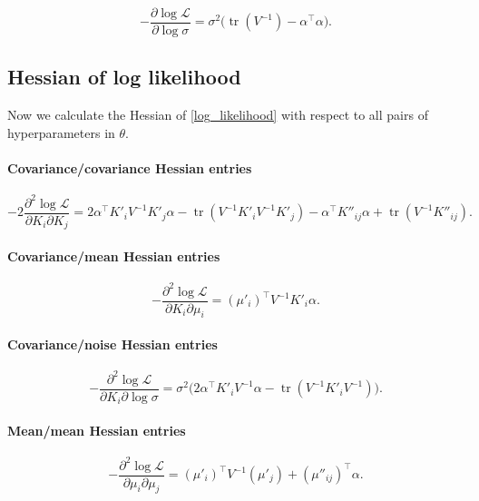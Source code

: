 \documentclass{article}
\newcommand{\cm}[1]{\mathcal{#1}}
\newcommand{\LL}{\cm{L}}
\newcommand{\trans}{^{\top}}
\newcommand{\inv}{^{-1}}
\DeclareMathOperator{\tr}{tr}
\begin{document}
\begin{equation*}
  -\frac{\partial \log \LL}{\partial \log \sigma}
  =
  \sigma^2 \bigl(\tr(V^{-1}) - \alpha\trans \alpha\bigr).
\end{equation*}

\subsection{Hessian of log likelihood}

Now we calculate the Hessian of \eqref{log_likelihood} with respect to
all pairs of hyperparameters in $\theta$.

\paragraph{Covariance/covariance Hessian entries}

\begin{equation*}
  -2 \frac{\partial^2 \log \LL}{\partial K_i \partial K_j}
  =
  2\alpha\trans K'_i  V\inv K'_j \alpha
  - \tr(V\inv K'_i V\inv K'_j)
  - \alpha\trans K''_{ij} \alpha
  + \tr(V\inv K''_{ij}).
\end{equation*}

\paragraph{Covariance/mean Hessian entries}

\begin{equation*}
  -\frac{\partial^2 \log \LL}{\partial K_i \partial \mu_i}
  =
  (\mu'_i)\trans V\inv K'_i \alpha.
\end{equation*}

\paragraph{Covariance/noise Hessian entries}

\begin{equation*}
  -\frac{\partial^2 \log \LL}{\partial K_i \partial \log \sigma}
  =
  \sigma^2
  \bigl(
  2\alpha\trans K'_i V\inv \alpha
  - \tr(V\inv K'_i V\inv)
  \bigr).
\end{equation*}

\paragraph{Mean/mean Hessian entries}

\begin{equation*}
  -\frac{\partial^2 \log \LL}{\partial \mu_i \partial \mu_j}
  =
  (\mu'_i)\trans V\inv (\mu'_j)
  + (\mu''_{ij})\trans \alpha.
\end{equation*}
\end{document}
